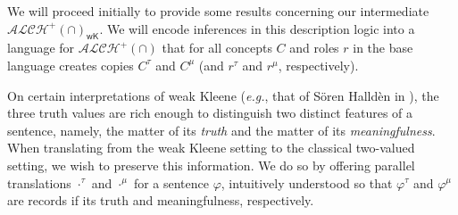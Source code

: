 \documentclass[letterpaper]{article} %
\theoremstyle{definition}
\theoremstyle{definition}
\theoremstyle{definition}
\theoremstyle{definition}
\theoremstyle{definition}
\begin{document}
We will proceed initially to provide some results concerning our intermediate $\mathcal{ALCH}^+(\cap)_{\mathsf{wK}}$. We will encode inferences in this description logic into a language for $\mathcal{ALCH}^+(\cap)$ that for all concepts $C$ and roles $r$ in the base language creates copies $C^{\tau}$ and $C^{\mu}$ (and $r^{\tau}$ and $r^{\mu}$, respectively).

On certain interpretations of weak Kleene (\emph{e.g.}, that of S\"{o}ren Halld\`{e}n in \cite{hallden}), the three truth values are rich enough to distinguish two distinct features of a sentence, namely, the matter of its \emph{truth} and the matter of its \emph{meaningfulness}. When translating from the weak Kleene setting to the classical two-valued setting, we wish to preserve this information. We do so by offering parallel translations $\cdot^{\tau}$ and $\cdot^{\mu}$ for a sentence $\varphi$, intuitively understood so that $\varphi^{\tau}$  and $\varphi^{\mu}$ are records if its truth and meaningfulness, respectively. 










\end{document}
